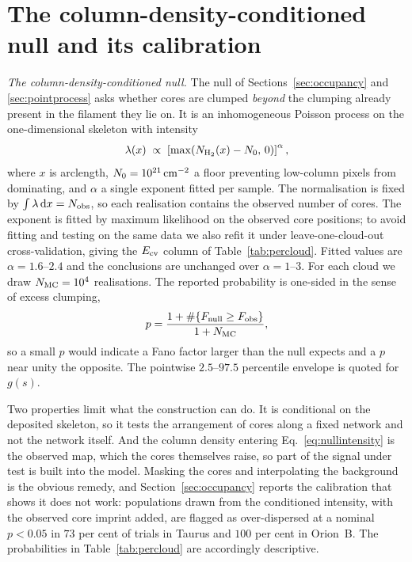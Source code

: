 \documentclass[usenatbib,twoside,twocolumn]{mnras}
\begin{document}
\section{The column-density-conditioned null and its calibration}
\label{sec:nullspec}

\emph{The column-density-conditioned null.} The null of Sections~\ref{sec:occupancy} and \ref{sec:pointprocess} asks whether cores are clumped \emph{beyond} the clumping already present in the filament they lie on. It is an inhomogeneous Poisson process on the one-dimensional skeleton with intensity
\begin{equation}
\lambda(x)\;\propto\;\left[\max\!\left(N_{\rm H_2}(x)-N_0,\,0\right)\right]^{\alpha},
\label{eq:nullintensity}
\end{equation}
where $x$ is arclength, $N_0=10^{21}\,{\rm cm^{-2}}$ a floor preventing low-column pixels from dominating, and $\alpha$ a single exponent fitted per sample. The normalisation is fixed by $\int\lambda\,{\rm d}x=N_{\rm obs}$, so each realisation contains the observed number of cores. The exponent is fitted by maximum likelihood on the observed core positions; to avoid fitting and testing on the same data we also refit it under leave-one-cloud-out cross-validation, giving the $E_{\rm cv}$ column of Table~\ref{tab:percloud}. Fitted values are $\alpha=1.6$--$2.4$ and the conclusions are unchanged over $\alpha=1$--$3$. For each cloud we draw $N_{\rm MC}=10^4$ realisations. The reported probability is one-sided in the sense of excess clumping,
\begin{equation}
p=\frac{1+\#\{F_{\rm null}\geq F_{\rm obs}\}}{1+N_{\rm MC}},
\label{eq:pval}
\end{equation}
so a small $p$ would indicate a Fano factor larger than the null expects and a $p$ near unity the opposite. The pointwise $2.5$--$97.5$ percentile envelope is quoted for $g(s)$.

Two properties limit what the construction can do. It is conditional on the deposited skeleton, so it tests the arrangement of cores along a fixed network and not the network itself. And the column density entering Eq.~\ref{eq:nullintensity} is the observed map, which the cores themselves raise, so part of the signal under test is built into the model. Masking the cores and interpolating the background is the obvious remedy, and Section~\ref{sec:occupancy} reports the calibration that shows it does not work: populations drawn from the conditioned intensity, with the observed core imprint added, are flagged as over-dispersed at a nominal $p<0.05$ in $73$ per cent of trials in Taurus and $100$ per cent in Orion~B. The probabilities in Table~\ref{tab:percloud} are accordingly descriptive.
\end{document}
